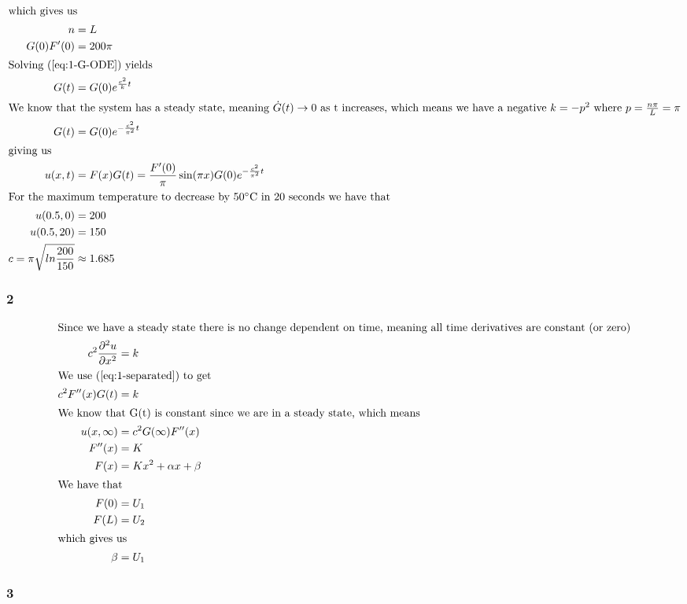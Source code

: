 \documentclass[a4paper]{article}
\newcommand{\ex}[1]{\subsubsection*{#1}}
\begin{document}
\begin{align}
    \intertext{which gives us}
    n &= L \\
    G(0)F'(0) &= 200\pi \\
    \intertext{Solving (\ref{eq:1-G-ODE}) yields}
    G(t) &= G(0)e^{\frac{c^2}{k}t} \\
    \intertext{We know that the system has a steady state, meaning \(\dot G(t)
        \to 0\) as t increases, which means we have a negative \(k = -p^2\)
        where \(p = \frac{n\pi}{L} = \pi\)}
    G(t) &= G(0)e^{-\frac{c^2}{\pi^2}t} \\
    \intertext{giving us}
    u(x,t) &= F(x)G(t) = \frac{F'(0)}{\pi} \sin (\pi x) G(0)e^{-\frac{c^2}{\pi^2}t} \\
    \intertext{For the maximum temperature to decrease by 50\degree C in 20
        seconds we have that}
    u(0.5, 0) &= 200 \\
    u(0.5, 20) &= 150 \\
    c = \pi \sqrt{ln\frac{200}{150}} &\approx 1.685  \\
\end{align}


\ex{2}
\begin{align} 
    \intertext{Since we have a steady state there is no change dependent on time, meaning all time derivatives are constant (or zero)}
    c^2 \frac{\partial^2 u}{\partial x^2} &= k \label{eq:2-def} \\
    \intertext{We use (\ref{eq:1-separated}) to get}
    c^2 F''(x)G(t) &= k \\
    \intertext{We know that G(t) is constant since we are in a steady state,
        which means}
    u(x,\infty) &= c^2G(\infty)F''(x) \\
    F''(x) &= K \\
    F(x) &= Kx^2 + \alpha x + \beta \\
    \intertext{We have that}
    F(0) &= U_1 \\
    F(L) &= U_2 \\
    \intertext{which gives us}
    \beta &= U_1
\end{align}


\ex{3}

%
\end{document}
